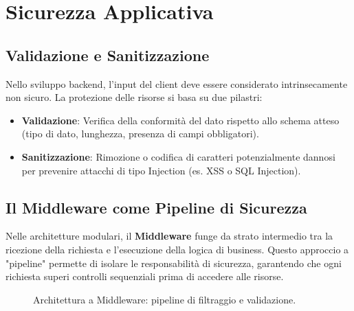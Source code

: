 \documentclass[11pt,a4paper]{report}
\begin{document}
\chapter{Sicurezza Applicativa}

\section{Validazione e Sanitizzazione}
Nello sviluppo backend, l'input del client deve essere considerato intrinsecamente non sicuro. La protezione delle risorse si basa su due pilastri:
\begin{itemize}[leftmargin=3em]
    \item \textbf{Validazione}: Verifica della conformità del dato rispetto allo schema atteso (tipo di dato, lunghezza, presenza di campi obbligatori).
    \item \textbf{Sanitizzazione}: Rimozione o codifica di caratteri potenzialmente dannosi per prevenire attacchi di tipo Injection (es. XSS o SQL Injection).
\end{itemize}

\section{Il Middleware come Pipeline di Sicurezza}
Nelle architetture modulari, il \textbf{Middleware} funge da strato intermedio tra la ricezione della richiesta e l'esecuzione della logica di business. Questo approccio a "pipeline" permette di isolare le responsabilità di sicurezza, garantendo che ogni richiesta superi controlli sequenziali prima di accedere alle risorse.

\begin{figure}[ht]
\centering
{}
\caption{Architettura a Middleware: pipeline di filtraggio e validazione.}
\end{figure}
\end{document}
